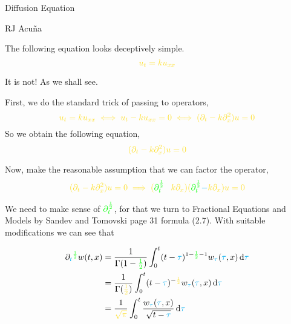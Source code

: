 \documentclass{article}
\begin{document}
\begin{center}
  Diffusion Equation

  RJ Acuña
\end{center}\vspace{1.618em}

The following equation looks deceptively simple.
\begin{equation}
  \color{Goldenrod} u_t = ku_{xx}
\end{equation}

It is not! As we
shall see.

First, we do the standard trick of passing to operators,
\[\color{Goldenrod}u_t = ku_{xx}\iff u_t -ku_{xx} = 0\iff (\partial_t
  -k\partial_x^2)u=0\]
So we obtain the following equation,
\begin{equation}
  \color{Goldenrod} (\partial_t
  -k\partial_x^2)u = 0
\end{equation}

Now, make the reasonable assumption that we can factor the operator,
\[\color{Goldenrod}(\partial_t
  -k\partial_x^2)u=0 \implies (\color{green}\partial_t^{\frac{1}{2}}\color{Goldenrod}
  {\color{white} +} k\partial_x)(\color{green}\partial_t^{\frac{1}{2}}
  \color{Goldenrod}{\color{cyan} -} k\partial_x)u=0\]

We need to make sense of $\color{green}\partial_t^{\frac{1}{2}}$, for
that we turn to Fractional Equations and Models by Sandev and Tomovski
page 31 formula (2.7). With suitable modifications we can see that

\begin{align*}
  \partial_{\color{cyan}t}^{\color{green}\frac{1}{2}} w(t,x)
  &= \frac{1}{\Gamma(1  -{\color{green}\frac{1}{2}})}\int_0^t(t-{\color{cyan}\tau})^{1-{\color{green}\frac{1}{2}}-1}
    w_{\color{cyan}\tau}({\color{cyan} \tau},x)\dd{\color{cyan}\tau}\\
  &=
    \frac{1}{\Gamma({\color{Goldenrod}\frac{1}{2}})}\int_0^t(t-{\color{cyan}
    \tau})^{-{\color{Goldenrod}\frac{1}{2}}}
    w_{\color{cyan}\tau}({\color{cyan} \tau},x)\dd{\color{cyan}\tau}\\
  &= \frac{1}{\color{Goldenrod} \sqrt{\pi}}\int_0^t
    \frac{w_{\color{cyan}\tau}({\color{cyan} \tau},x)}{\sqrt{t-{\color{cyan}\tau}}}\dd{\color{cyan}\tau}
\end{align*}
\end{document}
